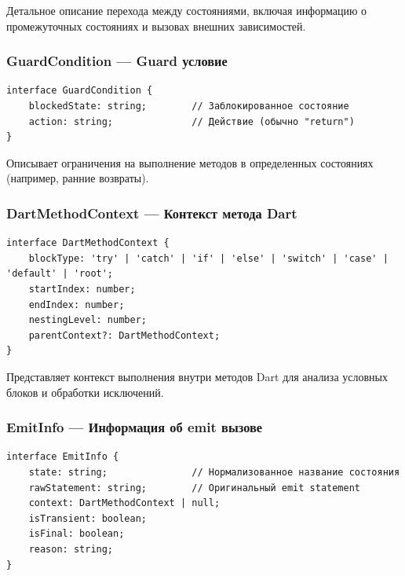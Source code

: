 \documentclass[14pt, russian]{scrartcl}
\begin{document}
Детальное описание перехода между состояниями, включая информацию о промежуточных состояниях и вызовах внешних зависимостей.

\subsubsection{GuardCondition — Guard условие}

\begin{verbatim}
interface GuardCondition {
    blockedState: string;        // Заблокированное состояние
    action: string;              // Действие (обычно "return")
}
\end{verbatim}

Описывает ограничения на выполнение методов в определенных состояниях (например, ранние возвраты).

\subsubsection{DartMethodContext — Контекст метода Dart}

\begin{verbatim}
interface DartMethodContext {
    blockType: 'try' | 'catch' | 'if' | 'else' | 'switch' | 'case' | 'default' | 'root';
    startIndex: number;
    endIndex: number;
    nestingLevel: number;
    parentContext?: DartMethodContext;
}
\end{verbatim}

Представляет контекст выполнения внутри методов Dart для анализа условных блоков и обработки исключений.

\subsubsection{EmitInfo — Информация об emit вызове}

\begin{verbatim}
interface EmitInfo {
    state: string;               // Нормализованное название состояния
    rawStatement: string;        // Оригинальный emit statement  
    context: DartMethodContext | null;
    isTransient: boolean;
    isFinal: boolean;
    reason: string;
}
\end{verbatim}
\end{document}
